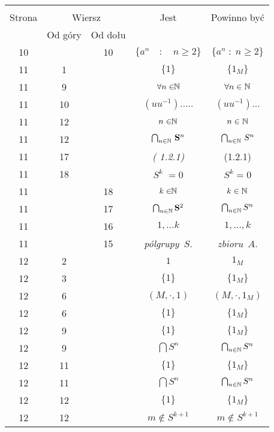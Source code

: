 \documentclass[a4paper,11pt]{article}
\begin{document}
\begin{center}
  \begin{tabular}{|c|c|c|c|c|}
    \hline
    & \multicolumn{2}{c|}{} & & \\
    Strona & \multicolumn{2}{c|}{Wiersz} & Jest
                              & Powinno być \\ \cline{2-3}
    & Od góry & Od dołu & & \\
    \hline
    10 & & 10 & $\{ a^{ n } \quad : \quad n \geq 2 \}$ & $\{ a^{ n } \; : \; n \geq 2 \}$ \\
    11 &  1 & & $\{ 1 \}$ & $\{ 1_{ M } \}$ \\
    11 &  9 & & $\forall n \in \!\! \mathbb{N}$ & $\forall n \in \mathbb{N}$ \\
    11 & 10 & & $( u u^{ -1 } ).....$ & $( u u^{ - 1 } ) \ldots$ \\
    11 & 12 & & $n \in \!\! \mathbb{N}$ & $n \in \mathbb{N}$ \\
    11 & 12 & & $\bigcap_{ n \in \mathbb{N} } \, \mathbf{S}^{ n }$
           & $\bigcap_{ n \in \mathbb{N} } \, S^{ n }$ \\
    11 & 17 & & \textit{( 1.2.1)} & (1.2.1) \\
    11 & 18 & & $S^{ k } \; = 0$ & $S^{ k } = 0$ \\
    11 & & 18 & $k \in \!\! \mathbb{N}$ & $k \in \mathbb{N}$ \\
    11 & & 17 & $\bigcap_{ n \in \mathbb{N} } \mathbf{S}^{ 2 }$
           & $\bigcap_{ n \in \mathbb{N} } S^{ n }$ \\
    11 & & 16 & $1, ...k$ & $1, \ldots, k$ \\
    11 & & 15 & \textit{pólgrupy}~$S$. & \textit{zbioru}~$A$. \\
    12 &  2 & & $1$ & $1_{ M }$ \\
    12 &  3 & & $\{ 1 \}$ & $\{ 1_{ M } \}$ \\
    12 &  6 & & $( M, \cdot, 1 )$ & $( M, \cdot, 1_{ M } )$ \\
    12 &  6 & & $\{ 1 \}$ & $\{ 1_{ M } \}$ \\
    12 &  9 & & $\{ 1 \}$ & $\{ 1_{ M } \}$ \\
    12 &  9 & & $\bigcap S^{ n }$ & $\bigcap_{ n \in \mathbb{N} } S^{ n }$ \\
    12 & 11 & & $\{ 1 \}$ & $\{ 1_{ M } \}$ \\
    12 & 11 & & $\bigcap S^{ n }$ & $\bigcap_{ n \in \mathbb{N} } S^{ n }$ \\
    12 & 12 & & $\{ 1 \}$ & $\{ 1_{ M } \}$ \\
    12 & 12 & & $m \!\! \notin \!\! S^{ k + 1 }$ & $m \notin S^{ k + 1 }$ \\

\end{tabular}
\end{center}
\end{document}
